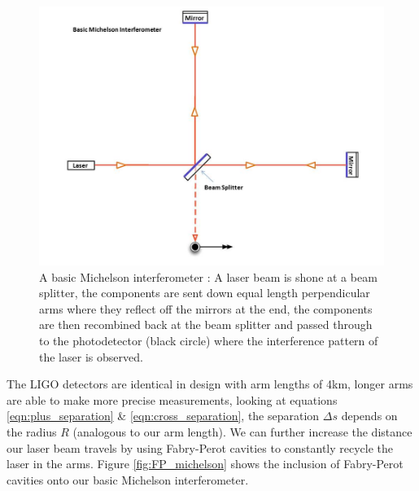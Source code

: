 \begin{figure}
   \includegraphics[width=\textwidth]{images/gr_gw/Basic_michelson_labeled.jpg}
   \caption{\label{fig:basic_michelson}A basic Michelson interferometer \cite{ligo_ifo}: A laser beam is shone at a beam splitter, the components are sent down equal length perpendicular arms where they reflect off the mirrors at the end, the components are then recombined back at the beam splitter and passed through to the photodetector (black circle) where the interference pattern of the laser is observed.}
\end{figure}

The LIGO detectors are identical in design with arm lengths of 4km, longer arms are able to make more precise measurements, looking at equations \ref{eqn:plus_separation} \& \ref{eqn:cross_separation}, the separation
$\Delta s$ depends on the radius $R$ (analogous to our arm length). We can further increase the distance our laser beam travels by using Fabry-Perot cavities to constantly recycle the laser in the arms. Figure \ref{fig:FP_michelson} shows the inclusion of Fabry-Perot cavities onto our basic Michelson interferometer.

